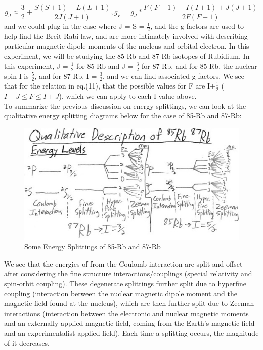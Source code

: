 \documentclass{article}
\begin{document}
    \begin{equation}
        g_J \approx \frac{3}{2} + \frac{S(S+1) - L(L+1)}{2J(J+1)}, g_F = g_J*\frac{F(F+1) - I(I+1) + J(J+1)}{2F(F+1)}
    \end{equation}
    and we could plug in the case where J = S = $\frac{1}{2}$, and the g-factors are used to help find the Breit-Rabi law, and are more intimately involved with describing particular magnetic dipole moments of the nucleus and orbital electron. In this experiment, we will be studying the 85-Rb and 87-Rb isotopes of Rubidium. In this experiment, J = $\frac{1}{2}$ for 85-Rb and J = $\frac{3}{2}$ for 87-Rb, and for 85-Rb, the nuclear spin I is $\frac{5}{2}$, and for 87-Rb, I = $\frac{3}{2}$, and we can find associated g-factors. We see that for the relation in eq.(11), %
    that the possible values for F are I$\pm \frac{1}{2}$ ($I-J\leq F \leq I + J$), which we can apply to each I value above.
    \\\indent To summarize the previous discussion on energy splittings, we can look at the qualitative energy splitting diagrams below for the case of 85-Rb and 87-Rb:
    \begin{figure}[H] %
        \centering
        \includegraphics[scale = 0.4]{11.jpg}
        \caption{Some Energy Splittings of 85-Rb and 87-Rb}
        \label{fig:my_label}
    \end{figure}
    We see that the energies of from the Coulomb interaction are split and offset after considering the fine structure interactions/couplings (special relativity and spin-orbit coupling). These degenerate splittings further split due to hyperfine coupling (interaction between the nuclear magnetic dipole moment and the magnetic field found at the nucleus), which are then further split due to Zeeman interactions (interaction between the electronic and nuclear magnetic moments and an externally applied magnetic field, coming from the Earth's magnetic field and an experimentalist applied field). Each time a splitting occurs, the magnitude of it decreases.
\end{document}
